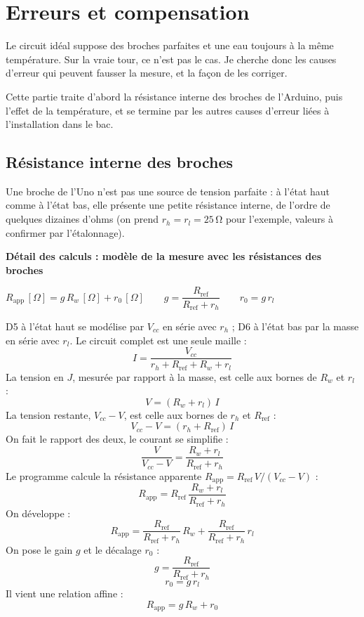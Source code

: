 \documentclass[11pt,a4paper]{article}
\newcommand{\resultat}[1]{\begin{center}{\large\color{bleuENO}$\displaystyle #1$}\end{center}}
\newenvironment{demo}[2]{\par\medskip\noindent\textbf{Détail des calculs : #1}\par\nopagebreak\resultat{#2}}{\par\medskip}
\newcommand{\U}[1]{\,\mathrm{#1}}
\begin{document}
\newpage
\section{Erreurs et compensation}
\label{sec:erreurs}

Le circuit idéal suppose des broches parfaites et une eau toujours à la même température. Sur la vraie tour, ce n'est pas le cas. Je cherche donc les causes d'erreur qui peuvent fausser la mesure, et la façon de les corriger.

Cette partie traite d'abord la résistance interne des broches de l'Arduino, puis l'effet de la température, et se termine par les autres causes d'erreur liées à l'installation dans le bac.


\subsection{Résistance interne des broches}

Une broche de l'Uno n'est pas une source de tension parfaite : à l'état haut comme à l'état bas, elle présente une petite résistance interne, de l'ordre de quelques dizaines d'ohms (on prend $r_h = r_l = 25\U{\Omega}$ pour l'exemple, valeurs à confirmer par l'étalonnage).

\begin{demo}{modèle de la mesure avec les résistances des broches}{R_{\text{app}}\,[\Omega] = g \, R_w\,[\Omega] + r_0\,[\Omega] \qquad g = \dfrac{R_{\text{ref}}}{R_{\text{ref}} + r_h} \qquad r_0 = g \, r_l}
D5 à l'état haut se modélise par $V_{cc}$ en série avec $r_h$ ; D6 à l'état bas par la masse en série avec $r_l$. Le circuit complet est une seule maille :
\[
I = \frac{V_{cc}}{r_h + R_{\text{ref}} + R_w + r_l}
\]
La tension en $J$, mesurée par rapport à la masse, est celle aux bornes de $R_w$ et $r_l$ :
\[
V = (R_w + r_l) \, I
\]
La tension restante, $V_{cc} - V$, est celle aux bornes de $r_h$ et $R_{\text{ref}}$ :
\[
V_{cc} - V = (r_h + R_{\text{ref}}) \, I
\]
On fait le rapport des deux, le courant se simplifie :
\[
\frac{V}{V_{cc} - V} = \frac{R_w + r_l}{R_{\text{ref}} + r_h}
\]
Le programme calcule la résistance apparente $R_{\text{app}} = R_{\text{ref}} \, V / (V_{cc} - V)$ :
\[
R_{\text{app}} = R_{\text{ref}} \, \frac{R_w + r_l}{R_{\text{ref}} + r_h}
\]
On développe :
\[
R_{\text{app}} = \frac{R_{\text{ref}}}{R_{\text{ref}} + r_h} \, R_w + \frac{R_{\text{ref}}}{R_{\text{ref}} + r_h} \, r_l
\]
On pose le gain $g$ et le décalage $r_0$ :
\[
g = \frac{R_{\text{ref}}}{R_{\text{ref}} + r_h}
\]
\[
r_0 = g \, r_l
\]
Il vient une relation affine :
\[
R_{\text{app}} = g \, R_w + r_0
\]
\end{demo}
\end{document}
